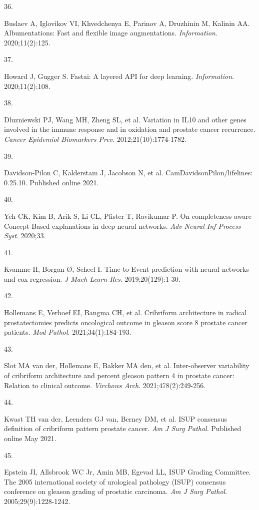 \documentclass[
  12pt,
  a5,margin=2cmpaper,
]{article}
\newlength{\cslhangindent}
\newlength{\csllabelwidth}
\newlength{\cslentryspacingunit} %
\newenvironment{CSLReferences}[2] %
 {%
  \setlength{\parindent}{0pt}
  \ifodd #1
  \let\oldpar\par
  \def\par{\hangindent=\cslhangindent\oldpar}
  \fi
  \setlength{\parskip}{#2\cslentryspacingunit}
 }%
 {}
\newcommand{\CSLLeftMargin}[1]{\parbox[t]{\csllabelwidth}{#1}}
\newcommand{\CSLRightInline}[1]{\parbox[t]{\linewidth - \csllabelwidth}{#1}\break}
\begin{document}
\begin{CSLReferences}{0}{0}
\leavevmode{}%
\CSLLeftMargin{36. }%
\CSLRightInline{Buslaev A, Iglovikov VI, Khvedchenya E, Parinov A,
Druzhinin M, Kalinin AA. Albumentations: Fast and flexible image
augmentations. \emph{Information}. 2020;11(2):125.}

\leavevmode{}%
\CSLLeftMargin{37. }%
\CSLRightInline{Howard J, Gugger S. Fastai: A layered {API} for deep
learning. \emph{Information}. 2020;11(2):108.}

\leavevmode{}%
\CSLLeftMargin{38. }%
\CSLRightInline{Dluzniewski PJ, Wang MH, Zheng SL, et al. Variation in
{IL10} and other genes involved in the immune response and in oxidation
and prostate cancer recurrence. \emph{Cancer Epidemiol Biomarkers Prev}.
2012;21(10):1774-1782.}

\leavevmode{}%
\CSLLeftMargin{39. }%
\CSLRightInline{Davidson-Pilon C, Kalderstam J, Jacobson N, et al.
{CamDavidsonPilon/lifelines}: 0.25.10. Published online 2021.}

\leavevmode{}%
\CSLLeftMargin{40. }%
\CSLRightInline{Yeh CK, Kim B, Arik S, Li CL, Pfister T, Ravikumar P. On
completeness-aware {Concept-Based} explanations in deep neural networks.
\emph{Adv Neural Inf Process Syst}. 2020;33.}

\leavevmode{}%
\CSLLeftMargin{41. }%
\CSLRightInline{Kvamme H, Borgan Ø, Scheel I. {Time-to-Event} prediction
with neural networks and cox regression. \emph{J Mach Learn Res}.
2019;20(129):1-30.}

\leavevmode{}%
\CSLLeftMargin{42. }%
\CSLRightInline{Hollemans E, Verhoef EI, Bangma CH, et al. Cribriform
architecture in radical prostatectomies predicts oncological outcome in
gleason score 8 prostate cancer patients. \emph{Mod Pathol}.
2021;34(1):184-193.}

\leavevmode{}%
\CSLLeftMargin{43. }%
\CSLRightInline{Slot MA van der, Hollemans E, Bakker MA den, et al.
Inter-observer variability of cribriform architecture and percent
gleason pattern 4 in prostate cancer: Relation to clinical outcome.
\emph{Virchows Arch}. 2021;478(2):249-256.}

\leavevmode{}%
\CSLLeftMargin{44. }%
\CSLRightInline{Kwast TH van der, Leenders GJ van, Berney DM, et al.
{ISUP} consensus definition of cribriform pattern prostate cancer.
\emph{Am J Surg Pathol}. Published online May 2021.}

\leavevmode{}%
\CSLLeftMargin{45. }%
\CSLRightInline{Epstein JI, Allsbrook WC Jr, Amin MB, Egevad LL, ISUP
Grading Committee. The 2005 international society of urological
pathology ({ISUP}) consensus conference on gleason grading of prostatic
carcinoma. \emph{Am J Surg Pathol}. 2005;29(9):1228-1242.}

\end{CSLReferences}
\end{document}
